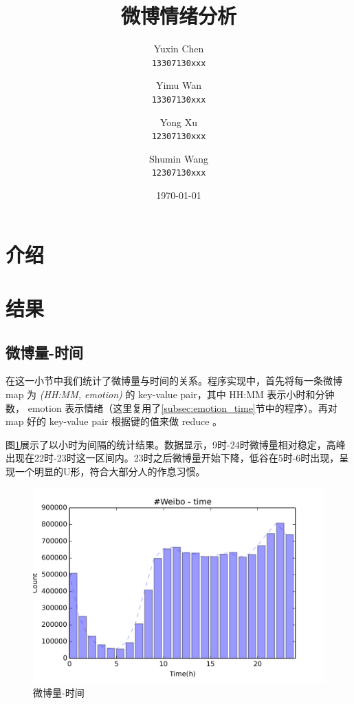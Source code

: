 \documentclass[12pt, oneside]{article}
\title{微博情绪分析}
\author{
	Yuxin Chen\\
	\texttt{13307130xxx}
	\and
	Yimu Wan\\
	\texttt{13307130xxx}
	\and
	Yong Xu\\
	\texttt{12307130xxx}
	\and
	Shumin Wang\\
	\texttt{12307130xxx}
}
\date{\today}
\begin{document}
\begin{spacing}{1.5}
\begin{CJK}{UTF8}{gbsn}

\maketitle


\newpage

\section{介绍}

\section{结果}
\subsection{微博量-时间}
\label{subsec:weibo_time}
在这一小节中我们统计了微博量与时间的关系。程序实现中，首先将每一条微博 map 为 {\it(HH:MM, emotion)} 的 key-value pair，其中 HH:MM 表示小时和分钟数， emotion 表示情绪（这里复用了\ref{subsec:emotion_time}节中的程序）。再对 map 好的 key-value pair 根据键的值来做 reduce 。 

图\ref{fig:weibo_time}展示了以小时为间隔的统计结果。数据显示，9时-24时微博量相对稳定，高峰出现在22时-23时这一区间内。23时之后微博量开始下降，低谷在5时-6时出现，呈现一个明显的U形，符合大部分人的作息习惯。

\begin{figure}
	\centering
	\includegraphics[width=0.8\linewidth]{../result/charts/weibo_time}
	\caption{微博量-时间}
	\label{fig:weibo_time}
\end{figure}


\end{CJK}
\end{spacing}
\end{document}
